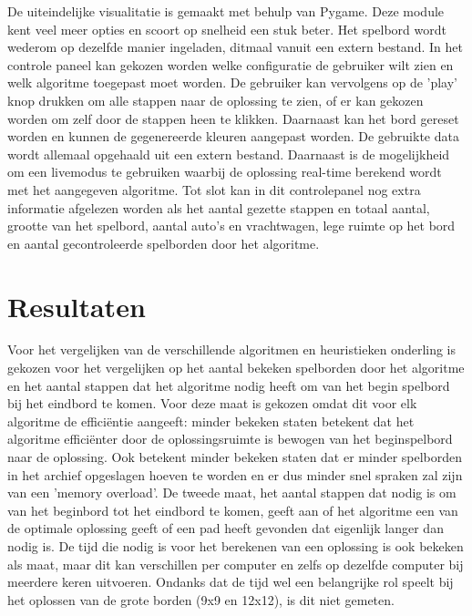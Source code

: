 \documentclass[a4paper]{article}
\begin{document}
    De uiteindelijke visualitatie is gemaakt met behulp van Pygame. Deze module kent veel meer opties en scoort op snelheid een stuk beter. Het spelbord wordt wederom op dezelfde manier ingeladen, ditmaal vanuit een extern bestand. In het controle paneel kan gekozen worden welke configuratie de gebruiker wilt zien en welk algoritme toegepast moet worden. De gebruiker kan vervolgens op de 'play' knop drukken om alle stappen naar de oplossing te zien, of er kan gekozen worden om zelf door de stappen heen te klikken. Daarnaast kan het bord gereset worden en kunnen de gegenereerde kleuren aangepast worden. De gebruikte data wordt allemaal opgehaald uit een extern bestand. Daarnaast is de mogelijkheid om een livemodus te gebruiken waarbij de oplossing real-time berekend wordt met het aangegeven algoritme. Tot slot kan in dit controlepanel nog extra informatie afgelezen worden als het aantal gezette stappen en totaal aantal, grootte van het spelbord, aantal auto's en vrachtwagen, lege ruimte op het bord en aantal gecontroleerde spelborden door het algoritme.
    
\section{Resultaten}
Voor het vergelijken van de verschillende algoritmen en heuristieken onderling is gekozen voor het vergelijken op het aantal bekeken spelborden door het algoritme en het aantal stappen dat het algoritme nodig heeft om van het begin spelbord bij het eindbord te komen. Voor deze maat is gekozen omdat dit voor elk algoritme de efficiëntie aangeeft: minder bekeken staten betekent dat het algoritme efficiënter door de oplossingsruimte is bewogen van het beginspelbord naar de oplossing. Ook betekent minder bekeken staten dat er minder spelborden in het archief opgeslagen hoeven te worden en er dus minder snel spraken zal zijn van een 'memory overload'. De tweede maat, het aantal stappen dat nodig is om van het beginbord tot het eindbord te komen, geeft aan of het algoritme een van de optimale oplossing geeft of een pad heeft gevonden dat eigenlijk langer dan nodig is. De tijd die nodig is voor het berekenen van een oplossing is ook bekeken als maat, maar dit kan verschillen per computer en zelfs op dezelfde computer bij meerdere keren uitvoeren. Ondanks dat de tijd wel een belangrijke rol speelt bij het oplossen van de grote borden (9x9 en 12x12), is dit niet gemeten.
	
\end{document}
